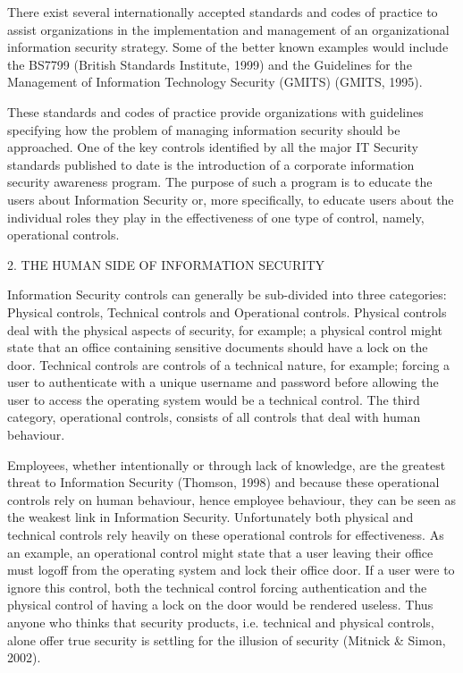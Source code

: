 There exist several internationally accepted standards and codes
of practice to assist organizations in the implementation and
management of an organizational information security strategy.
Some of the better known examples would include the BS7799
(British Standards Institute, 1999) and the Guidelines for the
Management of Information Technology Security (GMITS) (GMITS,
1995).

These standards and codes of practice provide organizations with
guidelines specifying how the problem of managing information
security should be approached. One of the key controls identified
by all the major IT Security standards published to date is the
introduction of a corporate information security awareness
program. The purpose of such a program is to educate the users
about Information Security or, more specifically, to educate users
about the individual roles they play in the effectiveness of one
type of control, namely, operational controls.

2.  THE HUMAN SIDE OF INFORMATION SECURITY

Information Security controls can generally be sub-divided into
three categories: Physical controls, Technical controls and
Operational controls. Physical controls deal with the physical
aspects of security, for example; a physical control might state
that an office containing sensitive documents should have a lock
on the door. Technical controls are controls of a technical
nature, for example; forcing a user to authenticate with a unique
username and password before allowing the user to access the
operating system would be a technical control. The third category,
operational controls, consists of all controls that deal with
human behaviour.

Employees, whether intentionally or through lack of knowledge, are
the greatest threat to Information Security (Thomson, 1998) and
because these operational controls rely on human behaviour, hence
employee behaviour, they can be seen as the weakest link in
Information Security. Unfortunately both physical and technical
controls rely heavily on these operational controls for
effectiveness. As an example, an operational control might state
that a user leaving their office must logoff from the operating
system and lock their office door. If a user were to ignore this
control, both the technical control forcing authentication and the
physical control of having a lock on the door would be rendered
useless. Thus anyone who thinks that security products, i.e.
technical and physical controls, alone offer true security is
settling for the illusion of security (Mitnick \& Simon, 2002).

